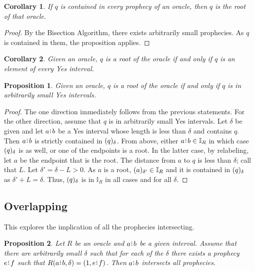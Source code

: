 \documentclass[12pt]{article}
\newtheorem{corollary}{Corollary}[section]
\newtheorem{proposition}{Proposition}[section]
\begin{document}
\begin{corollary}\label{os-root}
    If $q$ is contained in every prophecy of an oracle, then $q$ is the root of that oracle. 
\end{corollary}

\begin{proof}
    By the Bisection Algorithm, there exists arbitrarily small prophecies. As $q$ is contained in them, the proposition applies. 
\end{proof}



\begin{corollary}
    Given an oracle, $q$ is a root of the oracle if and only if $q$ is an element of every Yes interval. 
\end{corollary}

\begin{proposition}
    Given an oracle, $q$ is a root of the oracle if and only if $q$ is in arbitrarily small Yes intervals. 
\end{proposition}

\begin{proof}
   The one direction immediately follows from the previous statements. For the other direction, assume that $q$ is in arbitrarily small Yes intervals. Let $\delta$ be given and let $a\rint b$ be a Yes interval whose length is less than $\delta$ and contains $q$. Then $a\rint b$ is strictly contained in $\halo{q}$. From above, either $a\rint b \in \mathbb{I}_R$ in which case $\halo{q}$ is as well, or one of the endpoints is a root. In the latter case, by relabeling, let $a$ be the endpoint that is the root. The distance from $a$ to $q$ is less than $\delta$; call that $L$. Let $\delta' = \delta - L > 0$. As $a$ is a root, $\halo[\delta']{a} \in \mathbb{I}_R$ and it is contained in $\halo{q}$ as $\delta' + L = \delta$. Thus, $\halo{q}$ is in $\mathbb{I}_R$ in all cases and for all $\delta$.
\end{proof}


\subsection{Overlapping}


This explores the implication of all the prophecies intersecting. 

\begin{proposition}
    Let $R$ be an oracle and $a\rint b$ be a given interval. Assume that there are arbitrarily small $\delta$ such that for each of the $\delta$ there exists a prophecy $e\rint f$ such that $R(a \rint b, \delta) = (1, e\rint f)$. Then $a\rint b$ intersects all prophecies. 
\end{proposition}
\end{document}
